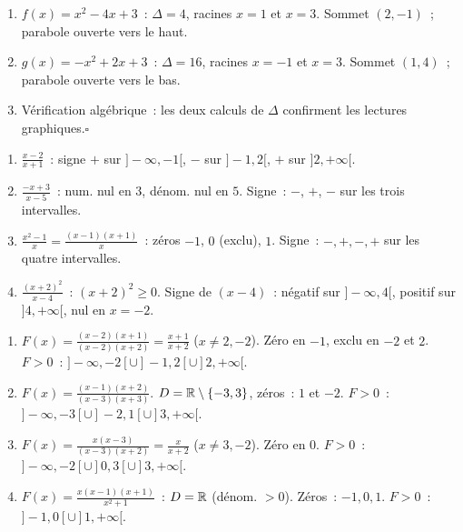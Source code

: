 
\begin{enumerate}
  \item $f(x)=x^2-4x+3$~: $\Delta=4$, racines $x=1$ et $x=3$.
        Sommet $(2,-1)$~; parabole ouverte vers le haut.
  \item $g(x)=-x^2+2x+3$~: $\Delta=16$, racines $x=-1$ et $x=3$.
        Sommet $(1,4)$~; parabole ouverte vers le bas.
  \item V\'erification alg\'ebrique~: les deux calculs de $\Delta$ confirment
        les lectures graphiques.\hfill$\square$
\end{enumerate}


\begin{enumerate}
  \item $\frac{x-2}{x+1}$~: signe $+$ sur $]-\infty,-1[$, $-$ sur $]-1,2[$,
        $+$ sur $]2,+\infty[$.
  \item $\frac{-x+3}{x-5}$~: num. nul en $3$, d\'enom. nul en $5$.
        Signe~: $-$, $+$, $-$ sur les trois intervalles.
  \item $\frac{x^2-1}{x}=\frac{(x-1)(x+1)}{x}$~: z\'eros $-1$, $0$ (exclu), $1$.
        Signe~: $-,+,-,+$ sur les quatre intervalles.
  \item $\frac{(x+2)^2}{x-4}$~: $(x+2)^2\geq0$. Signe de $(x-4)$~:
        n\'egatif sur $]-\infty,4[$, positif sur $]4,+\infty[$, nul en $x=-2$.
\end{enumerate}


\begin{enumerate}
  \item $F(x)=\frac{(x-2)(x+1)}{(x-2)(x+2)}=\frac{x+1}{x+2}$ ($x\ne2,-2$).
        Z\'ero en $-1$, exclu en $-2$ et $2$.
        $F>0$~: $]-\infty,-2[\cup]-1,2[\cup]2,+\infty[$.

  \item $F(x)=\frac{(x-1)(x+2)}{(x-3)(x+3)}$. $D=\mathbb{R}\setminus\{-3,3\}$, z\'eros~: $1$ et $-2$.
        $F>0$~: $]-\infty,-3[\cup]-2,1[\cup]3,+\infty[$.

  \item $F(x)=\frac{x(x-3)}{(x-3)(x+2)}=\frac{x}{x+2}$ ($x\ne3,-2$).
        Z\'ero en $0$.
        $F>0$~: $]-\infty,-2[\cup]0,3[\cup]3,+\infty[$.

  \item $F(x)=\frac{x(x-1)(x+1)}{x^2+1}$~: $D=\mathbb{R}$ (d\'enom. $>0$).
        Z\'eros~: $-1,0,1$. $F>0$~: $]-1,0[\cup]1,+\infty[$.
\end{enumerate}

